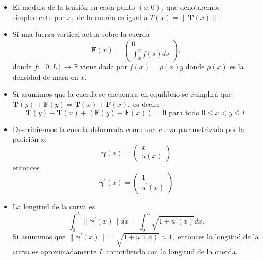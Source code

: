\documentclass[10pt,handout]{beamer}
\theoremstyle{plain} %
\theoremstyle{plain} %
\theoremstyle{plain} %
\theoremstyle{plain} %
\theoremstyle{definition}
\theoremstyle{example}
\theoremstyle{example}
\theoremstyle{remark}
\theoremstyle{remark}
\begin{document}
\begin{frame}
\begin{itemize}
\item El módulo de la tensión en cada punto $(x,0),$ que denotaremos simplemente por $x,$ de la cuerda es igual a  $T(x) = \|\mathbf{T}(x)\|.$
\item Si una fuerza vertical actua sobre la cuerda
$$\mathbf{F}(x) = \left( \begin{array}{c} 0 \\  \int_0^x f(s)ds  \end{array}\right),$$
donde $f:[0,L] \longrightarrow \mathbb{R}$ viene dada por
$f(x) = \rho(x)g$ donde $\rho(x)$ es la densidad de masa en $x.$
\item Si asumimos que la cuerda se encuentra en equilibrio se cumplirá que $\mathbf{T}(y)+\mathbf{F}(y)=\mathbf{T}(x)+\mathbf{F}(x),$ es decir:
$$
\mathbf{T}(y) - \mathbf{T}(x) + (\mathbf{F}(y) - \mathbf{F}(x)) = \mathbf{0} \text{ para todo } 0 \le x < y \le L
$$
\end{itemize}
\end{frame}

\begin{frame}
\begin{itemize}
\item Describiremos la cuerda deformada como una curva parametrizada por la posición $x:$
$$
\boldsymbol{\gamma}(x) = \left(
\begin{array}{c}
x \\ 
u(x)
\end{array}
\right)
$$
entonces
$$
\boldsymbol{\gamma}^{\prime}(x) = \left(
\begin{array}{c}
1 \\ 
u^{\prime}(x)
\end{array}
\right)
$$
\item La longitud de la curva es
$$
\int_0^L \|\boldsymbol{\gamma}^{\prime}(x)\|dx = \int_0^L \sqrt{1+u^{\prime}(x)}dx.
$$
Si asumimos que $\|\boldsymbol{\gamma}^{\prime}(x)\|= \sqrt{1+u^{\prime}(x)} \approx 1,$ entonces la longitud de la curva  es aproximadamente $L$ coincidiendo con la longitud de la cuerda.
\end{itemize}
\end{frame}
\end{document}
